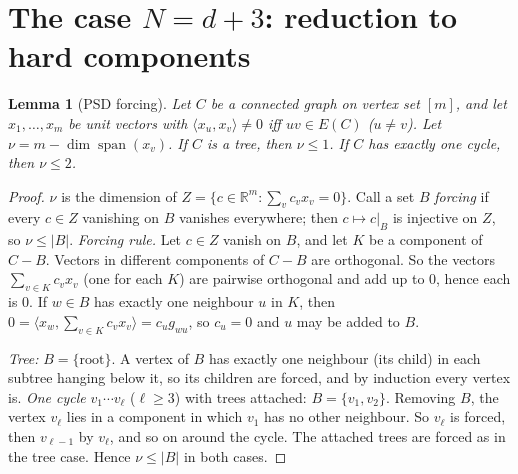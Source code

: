 \documentclass[11pt]{article}
\newtheorem{lemma}[theorem]{Lemma}
\theoremstyle{remark}
\begin{document}
\section{The case $N=d+3$: reduction to hard components}

\begin{lemma}[PSD forcing]\label{lem:force}
Let $C$ be a connected graph on vertex set $[m]$, and let $x_1,\dots,x_m$ be unit vectors with
$\langle x_u,x_v\rangle\ne0$ iff $uv\in E(C)$ ($u\ne v$). Let $\nu=m-\dim\operatorname{span}(x_v)$.
If $C$ is a tree, then $\nu\le1$. If $C$ has exactly one cycle, then $\nu\le2$.
\end{lemma}
\begin{proof}
$\nu$ is the dimension of $Z=\{c\in\mathbb R^m:\sum_vc_vx_v=0\}$. Call a set $B$ \emph{forcing} if every
$c\in Z$ vanishing on $B$ vanishes everywhere; then $c\mapsto c|_B$ is injective on $Z$, so
$\nu\le|B|$. \emph{Forcing rule.} Let $c\in Z$ vanish on $B$, and let $K$ be a component of $C-B$.
Vectors in different components of $C-B$ are orthogonal. So the vectors
$\sum_{v\in K}c_vx_v$ (one for each $K$) are pairwise orthogonal and add up to $0$, hence each is $0$. If
$w\in B$ has exactly one neighbour $u$ in $K$, then
$0=\langle x_w,\sum_{v\in K}c_vx_v\rangle=c_ug_{wu}$, so $c_u=0$ and $u$ may be added to $B$.

\emph{Tree:} $B=\{\text{root}\}$. A vertex of $B$ has exactly one neighbour (its child) in each
subtree hanging below it, so its children are forced, and by induction every vertex is.
\emph{One cycle} $v_1\cdots v_\ell$ ($\ell\ge3$) with trees attached: $B=\{v_1,v_2\}$. Removing $B$, the
vertex $v_\ell$ lies in a component in which $v_1$ has no other neighbour. So $v_\ell$ is forced, then
$v_{\ell-1}$ by $v_\ell$, and so on around the cycle. The attached trees are forced as in the tree
case. Hence $\nu\le|B|$ in both cases.
\end{proof}
\end{document}
